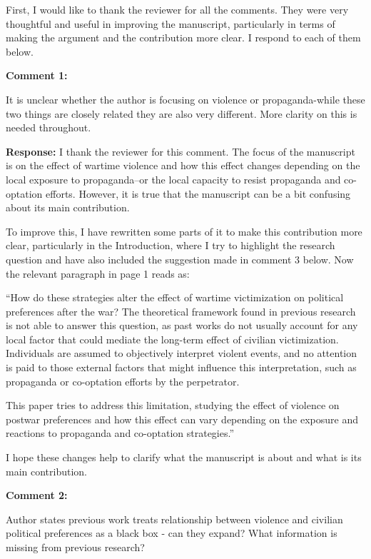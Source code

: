 \documentclass[12pt, a4paper, notitlepage]{article}
\begin{document}
First, I would like to thank the reviewer for all the comments. They were very thoughtful and useful in improving the manuscript, particularly in terms of making the argument and the contribution more clear. I respond to each of them below.

\vspace{15pt}
\noindent\textbf{Comment 1:}
\begin{displayquote}
It is unclear whether the author is focusing on violence or propaganda-while these two things are closely related they are also very different. More clarity on this is needed throughout.
\end{displayquote}

\noindent\textbf{Response:} I thank the reviewer for this comment. The focus of the manuscript is on the effect of wartime violence and how this effect changes depending on the local exposure to propaganda--or the local capacity to resist propaganda and co-optation efforts. However, it is true that the manuscript can be a bit confusing about its main contribution.

To improve this, I have rewritten some parts of it to make this contribution more clear, particularly in the Introduction, where I try to highlight the research question and have also included the suggestion made in comment 3 below. Now the relevant paragraph in page 1 reads as:


``How do these strategies alter the effect of wartime victimization on political preferences after the war?
The theoretical framework found in previous research is not able to answer this question, as past works do not usually account for any local factor that could mediate the long-term effect of civilian victimization.
Individuals are assumed to objectively interpret violent events, and no attention is paid to those external factors that might influence this interpretation, such as propaganda or co-optation efforts by the perpetrator.

This paper tries to address this limitation, studying the effect of violence on postwar preferences and how this effect can vary depending on the exposure and reactions to propaganda and co-optation strategies.''

I hope these changes help to clarify what the manuscript is about and what is its main contribution.

\vspace{15pt}
\noindent\textbf{Comment 2:}
\begin{displayquote}
Author states previous work treats relationship between violence and civilian political preferences as a black box - can they expand? What information is missing from previous research?
\end{displayquote}
\end{document}
